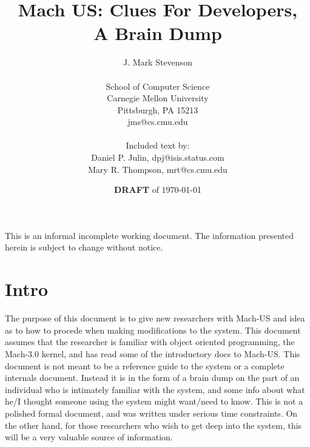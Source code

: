 
\newcommand{\comment}[1]{}
\newcommand{\MORE}{}
\newcommand{\CHECK}{(Check-This-Info)}
\newcommand{\SECREF}{section}

\topmargin 0in
\textheight 9in
\pagestyle{empty}
\makeatletter
\def\@oddfoot{\hfil\em DRAFT-\arabic{page}\hfil}
\let\@evenfoot=\@oddfoot
\makeatother

%

\title{Mach US: Clues For Developers,\\
A Brain Dump}
\author{J. Mark Stevenson \\
\\
School of Computer Science \\
Carnegie Mellon University \\
Pittsburgh, PA 15213 \\
jms@cs.cmu.edu \\
\\
Included text by: \\
Daniel P. Julin, dpj@isis.status.com \\
Mary R. Thompson, mrt@cs.cmu.edu}
\date{{\large {\bf DRAFT}} of \today}



\maketitle
{\large This is an informal incomplete working document.
The information presented herein is subject to change without notice.}

\section{Intro}
The purpose of this document is to give new researchers with Mach-US
and idea as to how to procede when making modifications to the system.  This
document assumes that the researcher is familiar with object oriented
programming, the Mach-3.0 kernel,
and has read some of the introductory docs to Mach-US.  
This document
is not meant to be a reference guide to the system or a complete internals
document.  Instead it is in the form of a brain dump on the part of an
individual who is intimately familiar with the system, and some info
about what he/I thought someone using the system might want/need to
know.  This is not a polished formal document, and was written under
serious time constraints.  On the other hand, for those researchers
who wish to get deep into the system, this will be a very valuable
source of information.

